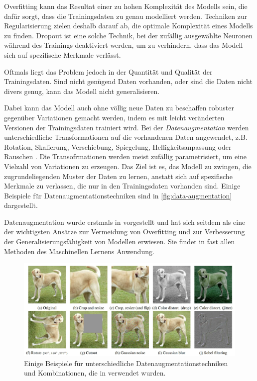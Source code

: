 Overfitting kann das Resultat einer zu hohen Komplexität des Modells sein, die dafür sorgt, dass die Trainingsdaten zu genau modelliert werden. Techniken zur Regularisierung zielen deshalb darauf ab, die optimale Komplexität eines Modells zu finden. Dropout \parencite{Srivastava2014dropout} ist eine solche Technik, bei der zufällig ausgewählte Neuronen während des Trainings deaktiviert werden, um zu verhindern, dass das Modell sich auf spezifische Merkmale verlässt. %

Oftmals liegt das Problem jedoch in der Quantität und Qualität der Trainingsdaten. Sind nicht genügend Daten vorhanden, oder sind die Daten nicht divers genug, kann das Modell nicht generalisieren.

Dabei kann das Modell auch ohne völlig neue Daten zu beschaffen robuster gegenüber Variationen gemacht werden, indem es mit leicht veränderten Versionen der Trainingsdaten trainiert wird. Bei der \emph{Datenaugmentation} werden unterschiedliche Transformationen auf die vorhandenen Daten angewendet, z.B. Rotation, Skalierung, Verschiebung, Spiegelung, Helligkeitsanpassung oder Rauschen \parencite{Shorten2019dataaugmentation}. Die Transofrmationen werden meist zufällig parametrisiert, um eine Vielzahl von Variationen zu erzeugen. Das Ziel ist es, das Modell zu zwingen, die zugrundeliegenden Muster der Daten zu lernen, anstatt sich auf spezifische Merkmale zu verlassen, die nur in den Trainingsdaten vorhanden sind. Einige Beispiele für Datenaugmentationstechniken sind in \autoref{fig:data-augmentation} dargestellt.

Datenaugmentation wurde erstmals in \parencite{LeCun1998dataaugmentation} vorgestellt und hat sich seitdem als eine der wichtigsten Ansätze zur Vermeidung von Overfitting und zur Verbesserung der Generalisierungsfähigkeit von Modellen erwiesen. Sie findet in fast allen Methoden des Maschinellen Lernens Anwendung.

\begin{figure}[h]
	\centering
	\includegraphics[width=\textwidth]{figure_data_augmentation.png}
	\caption{Einige Beispiele für unterschiedliche Datenaugmentationstechniken\\
	und Kombinationen, die in \parencite{Chen2020simclr} verwendet wurden.}
	\label{fig:data-augmentation}
\end{figure}

